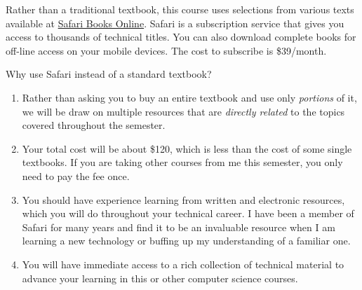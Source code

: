 Rather than a traditional textbook,
this course uses selections from various texts
available at
\href{https://www.safaribooksonline.com/}{Safari Books Online}.
Safari is a subscription service that gives you access
to thousands of technical titles.
You can also download complete books for off-line
access on your mobile devices.
The cost to subscribe is \$39/month.

Why use Safari instead of a standard textbook?
\begin{enumerate}
\item
  Rather than asking you to buy an entire textbook
  and use only \emph{portions} of it,
  we will be draw on multiple resources
  that are \emph{directly related} to the topics 
  covered throughout the semester.
\item
  Your total cost will be about \$120,
  which is less than the cost of some single textbooks.
  If you are taking other courses from me this semester,
  you only need to pay the fee once.
\item
  You should have experience learning from written
  and electronic resources, which you will do
  throughout your technical career.
  I have been a member of Safari for many years
  and find it to be an invaluable resource
  when I am learning a new technology
  or buffing up my understanding of a familiar one.
\item
  You will have immediate access to a rich collection
  of technical material to advance your learning in this
  or other computer science courses.
\end{enumerate}

